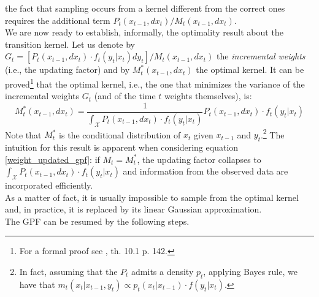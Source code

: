\documentclass[
]{book}
\theoremstyle{break}
\theoremstyle{nonumberplain}
\begin{document}
the fact that sampling occurs from a kernel different from the correct
ones requires the additional term
\(P_t(x_{t-1},dx_t)/M_t(x_{t-1},dx_t)\).~\\
We are now ready to establish, informally, the optimality result about
the transition kernel. Let us denote by
\(G_t=[P_t(x_{t-1},dx_t)\cdot f_t(y_t|x_t)dy_t]/M_t(x_{t-1},dx_t)\) the
\textit{incremental weights} (i.e., the updating factor) and by
\(M_t^*(x_{t-1},dx_t)\) the optimal kernel. It can be
proved\footnote{For a formal proof see \cite{**}, th. 10.1 p. 142.} that
the optimal kernel, i.e., the one that minimizes the variance of the
incremental weights \(G_t\) (and of the time \(t\) weights themselves),
is: \begin{equation}
    M_t^*(x_{t-1},dx_t)=\frac{1}{\int_{\mathcal X}P_t(x_{t-1},dx_t)\cdot f_t(y_t|x_t)} P_t(x_{t-1},dx_t)\cdot f_t(y_t|x_t)
\end{equation} Note that \(M_t^*\) is the conditional distribution of
\(x_t\) given \(x_{t-1}\) and
\(y_t\).\footnote{In fact, assuming that the $P_t$ admits a density $p_t$, applying Bayes rule, we have that $m_t(x_t|x_{t-1},y_t)\propto p_t(x_t|x_{t-1})\cdot f(y_t|x_t)$.}
The intuition for this result is apparent when considering equation
\eqref{weight_updated_gpf}: if \(M_t=M_t^*\), the updating factor
collapses to \(\int_{\mathcal X}P_t(x_{t-1},dx_t)\cdot f_t(y_t|x_t)\)
and information from the observed data are incorporated efficiently.\\
As a matter of fact, it is usually impossible to sample from the optimal
kernel and, in practice, it is replaced by its linear Gaussian
approximation. ~\\
The GPF can be resumed by the following steps.
\end{document}
